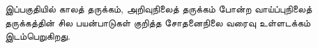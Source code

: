 \documentclass[../../include/open-logic-part]{subfiles}
\begin{document}

\begin{editorial}
இப்பகுதியில் காலத் தருக்கம், அறிவுநிலைத் தருக்கம் போன்ற வாய்ப்புநிலைத்
தருக்கத்தின் சில பயன்பாடுகள் குறித்த சோதனைநிலை வரைவு உள்ளடக்கம்
இடம்பெறுகிறது.
\end{editorial}



\OLEndPartHook
\end{document}
